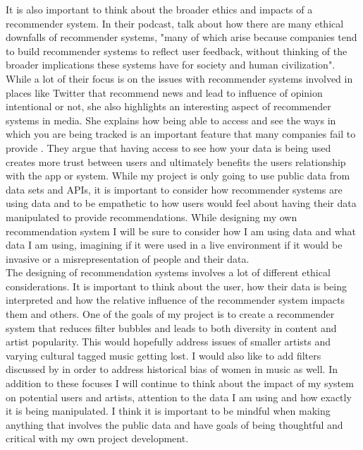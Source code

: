 \documentclass[10pt,twocolumn]{article}
\begin{document}
\indent It is also important to think about the broader ethics and impacts of a recommender system. In their podcast, \textcite{HarrisEthics} talk about how there are many ethical downfalls of recommender systems, "many of which arise because companies tend to build recommender systems to reflect user feedback, without thinking of the broader implications these systems have for society and human civilization". While a lot of their focus is on the issues with recommender systems involved in places like Twitter that recommend news and lead to influence of opinion intentional or not, she also highlights an interesting aspect of recommender systems in media. She explains how being able to access and see the ways in which you are being tracked is an important feature that many companies fail to provide \cite{HarrisEthics}. They argue that having access to see how your data is being used creates more trust between users and ultimately benefits the users relationship with the app or system. While my project is only going to use public data from data sets and APIs, it is important to consider how recommender systems are using data and to be empathetic to how users would feel about having their data manipulated to provide recommendations. While designing my own recommendation system I will be sure to consider how I am using data and what data I am using, imagining if it were used in a live environment if it would be invasive or a misrepresentation of people and their data. \\

\indent The designing of recommendation systems involves a lot of different ethical considerations. It is important to think about the user, how their data is being interpreted and how the relative influence of the recommender system impacts them and others. One of the goals of my project is to create a recommender system that reduces filter bubbles and leads to both diversity in content and artist popularity. This would hopefully address issues of smaller artists and varying cultural tagged music getting lost. I would also like to add filters discussed by \textcite{FerraroGenderImbalance} in order to address historical bias of women in music as well. In addition to these focuses I will continue to think about the impact of my system on potential users and artists, attention to the data I am using and how exactly it is being manipulated. I think it is important to be mindful when making anything that involves the public data and have goals of being thoughtful and critical with my own project development.

\printbibliography
\appendix

\clearpage

\onecolumn
\end{document}
